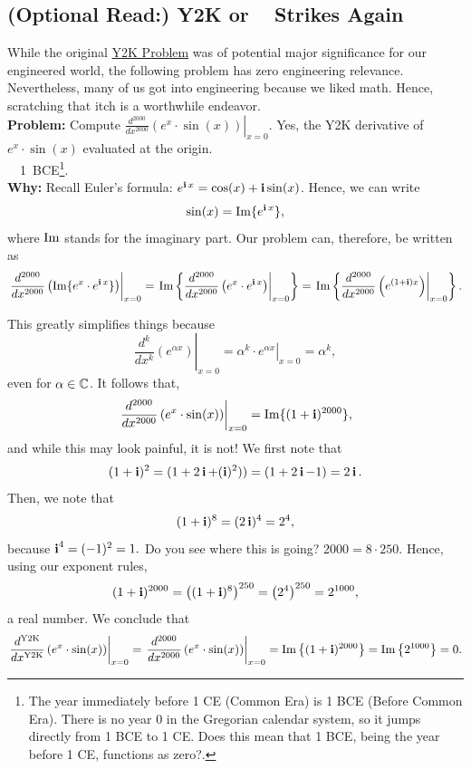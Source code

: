 \subsection {(Optional Read:) Y2K or \bprp~ Strikes Again}

While the original \href{https://en.wikipedia.org/wiki/Year_2000_problem}{Y2K Problem} was of potential major significance for our engineered world, the following problem has zero engineering relevance. Nevertheless, many of us got into engineering because we liked math. Hence, scratching that itch is a worthwhile endeavor. \\

\textbf{Problem:} Compute $ \left. \frac{d^{2000}}{dx^{2000}}\left( e^x \cdot \sin(x) \right) \right|_{x=0}.$ Yes, the Y2K derivative of $e^x \cdot \sin(x)$ evaluated at the origin. \\

\Ans ~~1~BCE\footnote{The year immediately before 1 CE (Common Era) is 1 BCE (Before Common Era). There is no year 0 in the Gregorian calendar system, so it jumps directly from 1 BCE to 1 CE. Does this mean that 1 BCE, being the year before 1 CE, functions as zero?.}.\\

\textbf{Why:} Recall Euler's formula: $e^{\mathop{\bm{\mathrm i}} x} = \cos(x) + \mathop{\bm{\mathrm i}} \sin(x)$. Hence, we can write
$$ \sin(x) = {\rm Im} \{ e^{\mathop{\bm{\mathrm i}} x} \},$$
where ${\rm Im}$ stands for the imaginary part. Our problem can, therefore, be written as 
$$ \left. \frac{d^{2000}}{dx^{2000}}\left( {\rm Im} \{e^x \cdot e^{\mathop{\bm{\mathrm i}} x} \} \right) \right|_{x=0} =  
\left. {\rm Im} \left\{\frac{d^{2000}}{dx^{2000}}\left( e^x \cdot e^{\mathop{\bm{\mathrm i}} x}  \right) \right|_{x=0}\right\} = \left. {\rm Im} \left\{\frac{d^{2000}}{dx^{2000}}\left(e^{(1 + \mathop{\bm{\mathrm i}})  x}  \right) \right|_{x=0}\right\}. $$

This greatly simplifies things because 
$$\left. \frac{d^k}{dx^k}\left( e^{\alpha x} \right) \right|_{x=0} = \left. \alpha^k \cdot e^{\alpha x} \right|_{x=0} = \alpha^k,$$
even for $\alpha \in \mathbb C$.
It follows that, 
$$ \left. \frac{d^{2000}}{dx^{2000}}\left( e^x \cdot \sin(x) \right) \right|_{x=0}  =   {\rm Im}\{ (1 + \mathop{\bm{\mathrm i}})^{2000} \},$$
and while this may look painful, it is not! We first note that 
$$(1+ \mathop{\bm{\mathrm i}})^2 = (1 + 2 \mathop{\bm{\mathrm i}} +(\mathop{\bm{\mathrm i}})^2)) = (1 + 2 \mathop{\bm{\mathrm i}} -1) = 2\mathop{\bm{\mathrm i}}. $$
Then, we note that 
$$(1+ \mathop{\bm{\mathrm i}})^8 = ( 2\mathop{\bm{\mathrm i}})^4 = 2^4, $$
because $\mathop{\bm{\mathrm i}}^4 = (-1)^2 = 1.$ Do you see where this is going? $2000 = 8 \cdot 250.$
Hence, using our exponent rules, 
$$ (1 + \mathop{\bm{\mathrm i}})^{2000} = \left( (1 + \mathop{\bm{\mathrm i}})^{8} \right)^{250} = \left( 2^4 \right)^{250} = 2^{1000},$$
a real number. We conclude that 
$$\left. \frac{d^{\rm Y2K}}{dx^{\rm Y2K}}\left( e^x \cdot \sin(x) \right) \right|_{x=0} = \left. \frac{d^{2000}}{dx^{2000}}\left( e^x \cdot \sin(x) \right) \right|_{x=0} = {\rm Im} \left\{ (1 + \mathop{\bm{\mathrm i}})^{2000} \right\} = {\rm Im} \left\{ 2^{1000}\right\} = 0.$$

